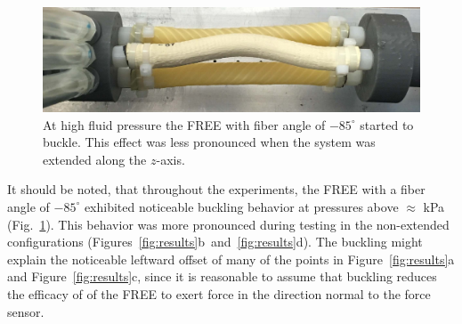 \begin{figure}
    \centering
    \includegraphics[width=\linewidth]{figures/photos/buckling.jpg}
    \caption{At high fluid pressure the FREE with fiber angle of $-85^\circ$ started to buckle.  This effect was less pronounced when the system was extended along the $z$-axis.}
    \label{fig:buckling}
\end{figure}


It should be noted, that throughout the experiments, the FREE with a fiber angle of $-85^\circ$ exhibited noticeable buckling behavior at pressures above $\approx$ \unit[50]{kPa} (Fig.~\ref{fig:buckling}). 
This behavior was more pronounced during testing in the non-extended configurations (Figures~\ref{fig:results}b~and~\ref{fig:results}d). 
The buckling might explain the noticeable leftward offset of many of the points in Figure~\ref{fig:results}a and Figure~\ref{fig:results}c, since it is reasonable to assume that buckling reduces the efficacy of of the FREE to exert force in the direction normal to the force sensor.


